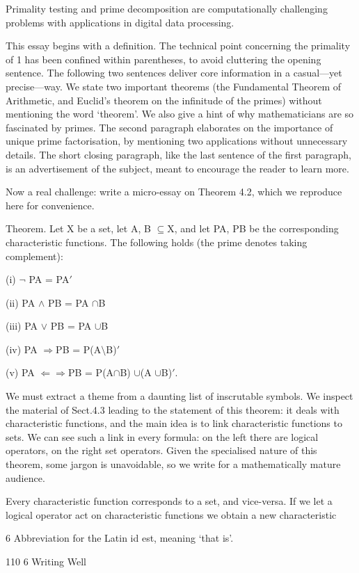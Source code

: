 \documentclass[11pt]{article}
\theoremstyle{plain}
\theoremstyle{definition}
\begin{document}
Primality testing and prime decomposition are computationally challenging problems with applications in digital data processing.

This essay begins with a definition. The technical point concerning the primality of 1 has been confined within parentheses, to avoid cluttering the opening sentence. The following two sentences deliver core information in a casual---yet precise---way. We state two important theorems (the Fundamental Theorem of Arithmetic, and Euclid's theorem on the infinitude of the primes) without mentioning the word `theorem'. We also give a hint of why mathematicians are so fascinated by primes. The second paragraph elaborates on the importance of unique prime factorisation, by mentioning two applications without unnecessary details. The short closing paragraph, like the last sentence of the first paragraph, is an advertisement of the subject, meant to encourage the reader to learn more.

Now a real challenge: write a micro-essay on Theorem 4.2, which we reproduce here for convenience.

Theorem. Let X be a set, let A, B $\subseteq$X, and let PA, PB be the corresponding characteristic functions. The following holds (the prime denotes taking complement):

(i) $\neg$ PA = PA$'$

(ii) PA $\land$ PB = PA $\cap$B

(iii) PA $\lor$ PB = PA $\cup$B

(iv) PA $\Rightarrow$PB = P(A$\setminus$B)$'$

(v) PA $\Leftarrow$$\Rightarrow$PB = P(A$\cap$B) $\cup$(A $\cup$B)$'$.

We must extract a theme from a daunting list of inscrutable symbols. We inspect the material of Sect.4.3 leading to the statement of this theorem: it deals with characteristic functions, and the main idea is to link characteristic functions to sets. We can see such a link in every formula: on the left there are logical operators, on the right set operators. Given the specialised nature of this theorem, some jargon is unavoidable, so we write for a mathematically mature audience.

Every characteristic function corresponds to a set, and vice-versa. If we let a logical operator act on characteristic functions we obtain a new characteristic

6 Abbreviation for the Latin id est, meaning `that is'.

110 6 Writing Well
\end{document}
